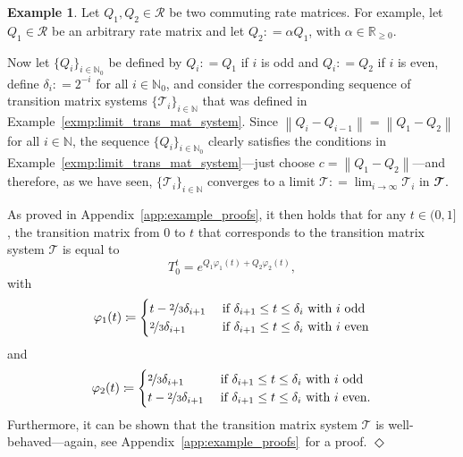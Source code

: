 \documentclass[10pt,a4paper]{paper}
\theoremstyle{definition}
\newtheorem{exmp}{Example}
\newcommand{\nats}{\mathbb{N}}
\newcommand{\reals}{\mathbb{R}}
\newcommand{\realsnonneg}{\reals_{\geq 0}}
\newcommand{\norm}[1]{\left\lVert #1 \right\rVert}
\newcommand{\coloneqq}{:\!=}
\newcommand{\exampleend}{\hfill$\Diamond$}
\newcommand{\exampleproofref}{Appendix~\ref{app:example_proofs}}
\begin{document}
\begin{exmp}\label{exmp:limit_trans_mat_system_matrices}
Let $Q_1,Q_2\in\mathcal{R}$ be two commuting rate matrices. For example, let $Q_1\in\mathcal{R}$ be an arbitrary rate matrix and let $Q_2\coloneqq\alpha Q_1$, with $\alpha\in\realsnonneg$. 

Now let $\{Q_i\}_{i\in\nats_0}$ be defined by $Q_i\coloneqq Q_1$ if $i$ is odd and $Q_i\coloneqq Q_2$ if $i$ is even, define $\delta_i\coloneqq 2^{-i}$ for all $i\in\nats_0$, and consider the corresponding sequence of transition matrix systems $\{\mathcal{T}_i\}_{i\in\nats}$ that was defined in Example~\ref{exmp:limit_trans_mat_system}.  Since $\norm{Q_i-Q_{i-1}}=\norm{Q_1-Q_2}$ for all $i\in\nats$, the sequence $\{Q_i\}_{i\in\nats_0}$ clearly satisfies the conditions in Example~\ref{exmp:limit_trans_mat_system}---just choose $c=\norm{Q_1-Q_2}$---and therefore, as we have seen, $\{\mathcal{T}_i\}_{i\in\nats}$ converges to a limit $\mathcal{T}\coloneqq \lim_{i\to\infty}\mathcal{T}_i$ in $\mathbfcal{T}$. 

As proved in \exampleproofref, it then holds that
for any $t\in(0,1]$, the transition matrix from $0$ to $t$ that corresponds to the transition matrix system $\mathcal{T}$ is equal to
\vspace{4pt}
\begin{equation}\label{eq:ex4:def}
T_0^t=e^{Q_1\varphi_1(t)+Q_2\varphi_2(t)},
\end{equation}
with
\begin{equation}\label{eq:ex4:phi1}
\varphi_1(t)
\coloneqq
\begin{cases}
t-\nicefrac{2}{3}\delta_{i+1}
&\text{ if $\delta_{i+1}\leq t\leq\delta_{i}$ with $i$ odd}\\
\nicefrac{2}{3}\delta_{i+1}
&\text{ if $\delta_{i+1}\leq t\leq\delta_{i}$ with $i$ even} 
\end{cases}
\end{equation}
and
\begin{equation}\label{eq:ex4:phi2}
\varphi_2(t)
\coloneqq
\begin{cases}
\nicefrac{2}{3}\delta_{i+1}
&\text{ if $\delta_{i+1}\leq t\leq\delta_{i}$ with $i$ odd}\\
t-\nicefrac{2}{3}\delta_{i+1}
&\text{ if $\delta_{i+1}\leq t\leq\delta_{i}$ with $i$ even.} 
\end{cases}
\vspace{7pt}
\end{equation}
Furthermore, it can be shown that the transition matrix system $\mathcal{T}$ is well-behaved---again, see \exampleproofref~for a proof.
\exampleend
\end{exmp}
\end{document}
